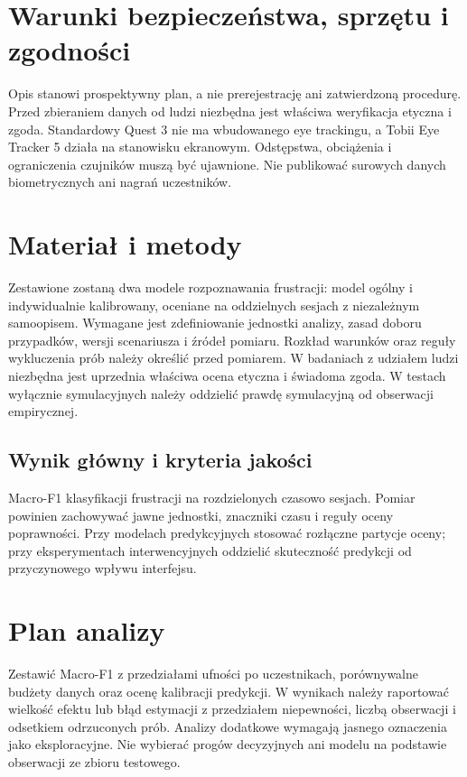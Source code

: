 \documentclass[11pt,a4paper]{article}
\begin{document}
\section{Warunki bezpieczeństwa, sprzętu i zgodności}
Opis stanowi prospektywny plan, a nie prerejestrację ani zatwierdzoną procedurę. Przed zbieraniem danych od ludzi niezbędna jest właściwa weryfikacja etyczna i zgoda. Standardowy Quest 3 nie ma wbudowanego eye trackingu, a Tobii Eye Tracker 5 działa na stanowisku ekranowym. Odstępstwa, obciążenia i ograniczenia czujników muszą być ujawnione. Nie publikować surowych danych biometrycznych ani nagrań uczestników.

\section{Materiał i metody}

Zestawione zostaną dwa modele rozpoznawania frustracji: model ogólny i indywidualnie kalibrowany, oceniane na oddzielnych sesjach z niezależnym samoopisem. Wymagane jest zdefiniowanie jednostki analizy, zasad doboru przypadków, wersji scenariusza i źródeł pomiaru. Rozkład warunków oraz reguły wykluczenia prób należy określić przed pomiarem. W badaniach z udziałem ludzi niezbędna jest uprzednia właściwa ocena etyczna i świadoma zgoda. W testach wyłącznie symulacyjnych należy oddzielić prawdę symulacyjną od obserwacji empirycznej.

\subsection{Wynik główny i kryteria jakości}

Macro-F1 klasyfikacji frustracji na rozdzielonych czasowo sesjach. Pomiar powinien zachowywać jawne jednostki, znaczniki czasu i reguły oceny poprawności. Przy modelach predykcyjnych stosować rozłączne partycje oceny; przy eksperymentach interwencyjnych oddzielić skuteczność predykcji od przyczynowego wpływu interfejsu.

\section{Plan analizy}

Zestawić Macro-F1 z przedziałami ufności po uczestnikach, porównywalne budżety danych oraz ocenę kalibracji predykcji. W wynikach należy raportować wielkość efektu lub błąd estymacji z przedziałem niepewności, liczbą obserwacji i odsetkiem odrzuconych prób. Analizy dodatkowe wymagają jasnego oznaczenia jako eksploracyjne. Nie wybierać progów decyzyjnych ani modelu na podstawie obserwacji ze zbioru testowego.
\end{document}
